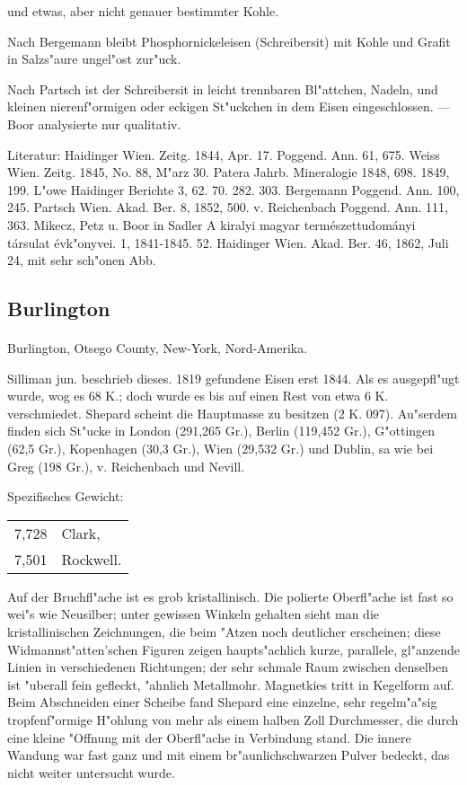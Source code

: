 \documentclass[a4paper, 11pt, oneside]{article}
\begin{document}
und etwas, aber nicht genauer bestimmter Kohle.

Nach Bergemann bleibt Phosphornickeleisen (Schreibersit) mit Kohle und Grafit in Salzs"aure ungel"ost zur"uck.

Nach Partsch ist der Schreibersit in leicht trennbaren Bl"attchen, Nadeln, und kleinen nierenf"ormigen oder eckigen St"uckchen in dem Eisen eingeschlossen. --- Boor analysierte nur qualitativ.

\footnotesize
Literatur: Haidinger Wien. Zeitg. 1844, Apr. 17. Poggend. Ann. 61, 675. Weiss Wien. Zeitg. 1845, No. 88, M"arz 30. Patera Jahrb. Mineralogie 1848, 698. 1849, 199. L"owe Haidinger Berichte 3, 62. 70. 282. 303. Bergemann Poggend. Ann. 100, 245. Partsch Wien. Akad. Ber. 8, 1852, 500. v. Reichenbach Poggend. Ann. 111, 363. Mikecz, Petz u. Boor in Sadler A kiralyi magyar természettudományi társulat évk"onyvei. 1, 1841-1845. 52. Haidinger Wien. Akad. Ber. 46, 1862, Juli 24, mit sehr sch"onen Abb.

\subsection{Burlington}
\normalsize
\paragraph{}
Burlington, Otsego County, New-York, Nord-Amerika.

Silliman jun. beschrieb dieses. 1819 gefundene Eisen erst 1844. Als es ausgepfl"ugt wurde, wog es 68 K.; doch wurde es bis auf einen Rest von etwa 6 K. verschmiedet. Shepard scheint die Hauptmasse zu besitzen (2 K. 097). Au"serdem finden sich St"ucke in London (291,265 Gr.), Berlin (119,452 Gr.), G"ottingen (62,5 Gr.), Kopenhagen (30,3 Gr.), Wien (29,532 Gr.) und Dublin, sa wie bei Greg (198 Gr.), v. Reichenbach und Nevill.

Spezifisches Gewicht:  
\begin{table}[!ht]
    \centering
    \begin{tabular}{l l}
        7,728 & Clark,\\
        7,501 & Rockwell.
    \end{tabular}
\end{table}

Auf der Bruchfl"ache ist es grob kristallinisch. Die polierte Oberfl"ache ist fast so wei"s wie Neusilber; unter gewissen Winkeln gehalten sieht man die kristallinischen Zeichnungen, die beim "Atzen noch deutlicher erscheinen; diese Widmannst"atten'schen Figuren zeigen haupts"achlich kurze, parallele, gl"anzende Linien in verschiedenen Richtungen; der sehr schmale Raum zwischen denselben ist "uberall fein gefleckt, "ahnlich Metallmohr. Magnetkies tritt in Kegelform auf. Beim Abschneiden einer Scheibe fand Shepard eine einzelne, sehr regelm"a"sig tropfenf"ormige H"ohlung von mehr als einem halben Zoll Durchmesser, die durch eine kleine "Offnung mit der Oberfl"ache in Verbindung stand. Die innere Wandung war fast ganz und mit einem br"aunlichschwarzen Pulver bedeckt, das nicht weiter untersucht wurde.
\end{document}
